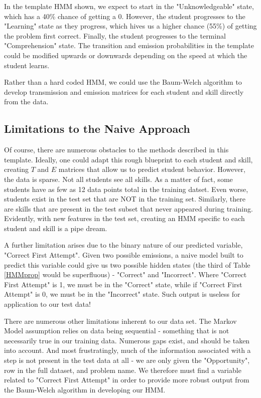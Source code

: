 \documentclass{article} %
\begin{document}
In the template HMM shown, we expect to start in the "Unknowledgeable" state, which has a 40\% chance of getting a 0. However, the student progresses to the "Learning" state as they progress, which hives us a higher chance (55\%) of getting the problem first correct. Finally, the student progresses to the terminal "Comprehension" state. The transition and emission probabilities in the template could be modified upwards or downwards depending on the speed at which the student learns.

Rather than a hard coded HMM, we could use the Baum-Welch algorithm to develop transmission and emission matrices for each student and skill directly from the data.

\subsection{Limitations to the Naive Approach}

Of course, there are numerous obstacles to the methods described in this template. Ideally, one could adapt this rough blueprint to each student and skill, creating $T$ and $E$ matrices that allow us to predict student behavior. However, the data is sparse. Not all students see all skills. As a matter of fact, some students have as few as 12 data points total in the training datset. Even worse, students exist in the test set that are NOT in the training set. Similarly, there are skills that are present in the test subset that never appeared during training. Evidently, with new features in the test set, creating an HMM specific to each student and skill is a pipe dream.

A further limitation arises due to the binary nature of our predicted variable, "Correct First Attempt". Given two possible emissions, a naive model built to predict this variable could give us two possible hidden states (the third of Table \ref{HMMprop} would be superfluous) - "Correct" and "Incorrect". Where "Correct First Attempt" is 1, we must be in the "Correct" state, while if "Correct First Attempt" is 0, we must be in the "Incorrect" state. Such output is useless for application to our test data!

There are numerous other limitations inherent to our data set. The Markov Model assumption relies on data being sequential - something that is not necessarily true in our training data. Numerous gaps exist, and should be taken into account. And most frustratingly, much of the information associated with a step is not present in the test data at all - we are only given the "Opportunity", row in the full dataset, and problem name. We therefore must find a variable related to "Correct First Attempt" in order to provide more robust output from the Baum-Welch algorithm in developing our HMM.
\end{document}
